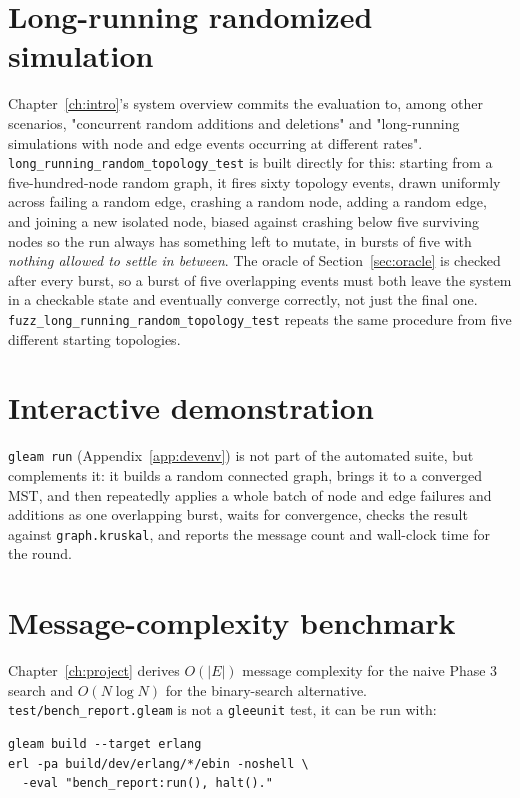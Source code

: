 \section{Long-running randomized simulation}\label{sec:long-running}

Chapter~\ref{ch:intro}'s system overview commits the evaluation to, among other scenarios,
"concurrent random additions and deletions" and "long-running simulations with node and
edge events occurring at different rates". \texttt{long\_running\_random\_topology\_test}
is built directly for this: starting from a five-hundred-node random graph, it fires sixty
topology events, drawn uniformly across failing a random edge, crashing a random node,
adding a random edge, and joining a new isolated node, biased against crashing below five
surviving nodes so the run always has something left to mutate, in bursts of five with
\emph{nothing allowed to settle in between}. The oracle of Section~\ref{sec:oracle} is
checked after every burst, so a burst of five overlapping events
must both leave the system in a checkable state and eventually converge correctly, not just
the final one. \texttt{fuzz\_long\_running\_random\_topology\_test} repeats the same
procedure from five different starting topologies. 

\section{Interactive demonstration}

\texttt{gleam run} (Appendix~\ref{app:devenv}) is not part of the automated suite, but
complements it: it builds a random connected graph, brings it to a converged MST, and then
repeatedly applies
a whole batch of node and edge failures and additions as one overlapping burst, waits for
convergence, checks the result against \texttt{graph.kruskal}, and reports the message
count and wall-clock time for the round.

\section{Message-complexity benchmark}\label{sec:bench}

Chapter~\ref{ch:project} derives $O(|E|)$ message complexity for the naive Phase 3 search
and $O(N \log N)$ for the binary-search alternative. \texttt{test/bench\_report.gleam} is
not a \texttt{gleeunit} test, it can be run with:

{\footnotesize
\begin{verbatim}
gleam build --target erlang
erl -pa build/dev/erlang/*/ebin -noshell \
  -eval "bench_report:run(), halt()."
\end{verbatim}
}

